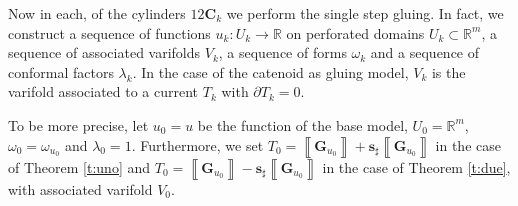 \documentclass[reqno]{amsart}
\theoremstyle{definition}
\theoremstyle{remark}
\numberwithin{equation}{section}
\newcommand{\R}{\mathbb{R}}
\newcommand{\bC}{\mathbf{C}} %
\newcommand{\bG}{\mathbf{G}} %
\def\a#1{\left\llbracket{#1}\right\rrbracket}
\begin{document}
Now in each, of the cylinders $12 \bC_k$ we perform the single step gluing.
In fact, we construct a sequence of functions $u_k \colon U_k \to \R$ on perforated domains $U_k\subset \R^m$, a sequence of associated varifolds $V_k$, a sequence of forms $\omega_k$ and a sequence of conformal factors $\lambda_k$. In the case of the catenoid as gluing model, $V_k$ is the varifold associated to a current $T_k$ with $\partial T_k =0$. 

To be more precise, let $u_0 = u$ be the function of the base model, $U_0=\R^{m}$, $\omega_0=\omega_{u_0}$ and $\lambda_0 =1$. Furthermore, we set $T_0=\a{\bG_{u_0}} + \boldsymbol{s}_\sharp \a{\bG_{u_0}}$  in the case of Theorem \ref{t:uno} and $T_0=\a{\bG_{u_0}} - \boldsymbol{s}_\sharp \a{\bG_{u_0}}$ in the case of Theorem \ref{t:due}, with associated varifold $V_0$.
\end{document}
